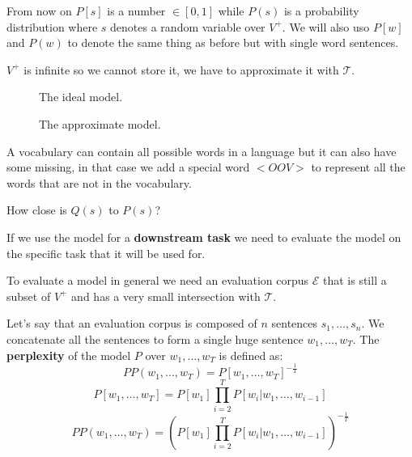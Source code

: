 From now on $P[s]$ is a number $\in[0,1]$ while $P(s)$ is a probability distribution where $s$ denotes a random variable
over $V^+$. We will also uso $P[w]$ and $P(w)$ to denote the same thing as before but with single word sentences.

$V^+$ is infinite so we cannot store it, we have to approximate it with $\mathcal{T}$.
\begin{figure}[H]
    \centering
    \caption{The ideal model.}
    \label{fig:language_model}
\end{figure}

\begin{figure}[H]
    \centering
    \caption{The approximate model.}
    \label{fig:approximated_language_model}
\end{figure}

A vocabulary can contain all possible words in a language
but it can also have some missing, in that case we add a special word $<OOV>$ to represent
all the words that are not in the vocabulary.

How close is $Q(s)$ to $P(s)$?

If we use the model for a \textbf{downstream task} we need to evaluate the model on the specific task that
it will be used for.

To evaluate a model in general we need an evaluation corpus $\mathcal{E}$ that is
still a subset of $V^+$ and has a very small intersection with $\mathcal{T}$.

Let's say that an evaluation corpus is composed of $n$ sentences $s_1,\dots,s_n$.
We concatenate all the sentences to form a single huge sentence $w_1,\dots,w_T$.
The \textbf{perplexity} of the model $P$ over $w_1,\dots,w_T$ is defined as:
\[
    PP(w_1,\dots,w_T)=P[w_1,\dots,w_T]^{-\frac{1}{T}}
\]
\[
    P[w_1,\dots,w_T]=P[w_1]\prod_{i=2}^{T}P[w_i|w_1,\dots,w_{i-1}]
\]
\[
    PP(w_1,\dots,w_T)=\left(P[w_1]\prod_{i=2}^{T}P[w_i|w_1,\dots,w_{i-1}]\right)^{-\frac{1}{T}}
\]


